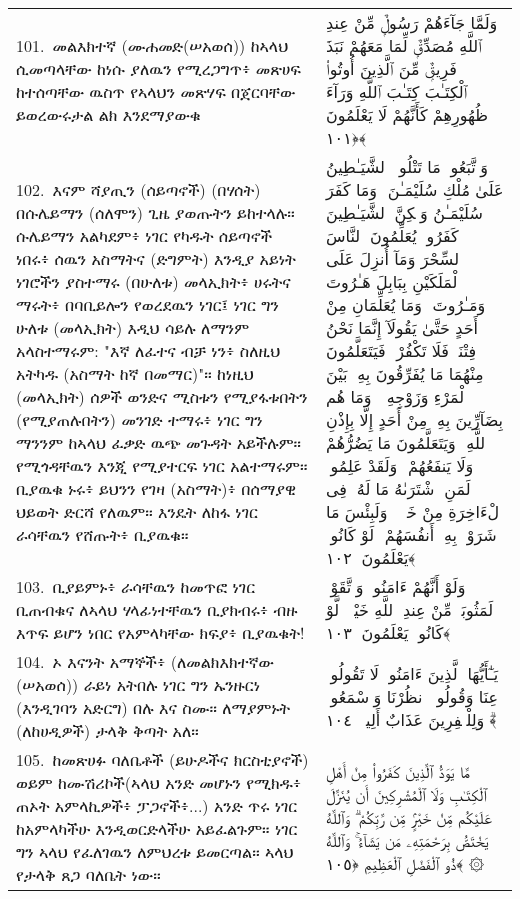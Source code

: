 \documentclass[11pt,a4paper,oneside]{article}%
\newcommand{\mytextarabic}[1]{\textarabic{ #1 \flushright}}
\begin{document}
\begin{longtable}{%
  @{}
    p{}
  @{~~~}
    p{}
    @{}
}
101.\ መልእክተኛ (ሙሐመድ(ሠአወሰ)) ከኣላህ ሲመጣላቸው ከነሱ ያለዉን የሚረጋግጥ፥ መጽሀፍ ከተሰጣቸው ዉስጥ የኣላህን መጽሃፍ በጀርባቸው ይወረውሩታል ልክ እንደማያውቁ  &  \mytextarabic{ وَلَمَّا جَآءَهُمْ رَسُولٌۭ مِّنْ عِندِ ٱللَّهِ مُصَدِّقٌۭ لِّمَا مَعَهُمْ نَبَذَ فَرِيقٌۭ مِّنَ ٱلَّذِينَ أُوتُوا۟ ٱلْكِتَـٰبَ كِتَـٰبَ ٱللَّهِ وَرَآءَ ظُهُورِهِمْ كَأَنَّهُمْ لَا يَعْلَمُونَ ﴿١٠١﴾}\\
102.\ እናም ሻያጢን (ሰይጣኖች) (በሃሰት) በሱሌይማን (ሰለሞን) ጊዜ ያወጡትን ይከተላሉ። ሱሌይማን አልካደም፥ ነገር የካዱት ሰይጣኖች ነበሩ፥ ሰዉን አስማትና (ድግምት) እንዲያ አይነት ነገሮችን ያስተማሩ (በሁለቱ) መላኢክት፥ ሀሩትና ማሩት፥ በባቢይሎን የወረደዉን ነገር፤ ነገር ግን ሁለቱ (መላኢክት) እዲህ ሳይሉ ለማንም አላስተማሩም: "እኛ ለፈተና ብቻ ነን፥ ስለዚህ አትካዱ (አስማት ከኛ በመማር)"። ከነዚህ (መላኢክት) ሰዎች ወንድና ሚስቱን የሚያፋቱበትን (የሚያጠሉበትን) መንገድ ተማሩ፥ ነገር ግን ማንንም ከኣላህ ፈቃድ ዉጭ መጉዳት አይችሉም። የሚጎዳቸዉን እንጂ የሚያተርፍ ነገር አልተማሩም። ቢያዉቁ ኑሩ፥ ይህንን የገዛ (አስማት)፥ በሰማያዊ ህይወት ድርሻ የለዉም። እንዴት ለከፋ ነገር ራሳቸዉን የሸጡት፥ ቢያዉቁ። &  \mytextarabic{ وَٱتَّبَعُوا۟ مَا تَتْلُوا۟ ٱلشَّيَـٰطِينُ عَلَىٰ مُلْكِ سُلَيْمَـٰنَ ۖ وَمَا كَفَرَ سُلَيْمَـٰنُ وَلَٟكِنَّ ٱلشَّيَـٰطِينَ كَفَرُوا۟ يُعَلِّمُونَ ٱلنَّاسَ ٱلسِّحْرَ وَمَآ أُنزِلَ عَلَى ٱلْمَلَكَيْنِ بِبَابِلَ هَـٰرُوتَ وَمَـٰرُوتَ ۚ وَمَا يُعَلِّمَانِ مِنْ أَحَدٍ حَتَّىٰ يَقُولَآ إِنَّمَا نَحْنُ فِتْنَةٌۭ فَلَا تَكْفُرْ ۖ فَيَتَعَلَّمُونَ مِنْهُمَا مَا يُفَرِّقُونَ بِهِۦ بَيْنَ ٱلْمَرْءِ وَزَوْجِهِۦ ۚ وَمَا هُم بِضَآرِّينَ بِهِۦ مِنْ أَحَدٍ إِلَّا بِإِذْنِ ٱللَّهِ ۚ وَيَتَعَلَّمُونَ مَا يَضُرُّهُمْ وَلَا يَنفَعُهُمْ ۚ وَلَقَدْ عَلِمُوا۟ لَمَنِ ٱشْتَرَىٰهُ مَا لَهُۥ فِى ٱلْءَاخِرَةِ مِنْ خَلَٟقٍۢ ۚ وَلَبِئْسَ مَا شَرَوْا۟ بِهِۦٓ أَنفُسَهُمْ ۚ لَوْ كَانُوا۟ يَعْلَمُونَ ﴿١٠٢﴾}\\
103.\ ቢያይምኑ፥ ራሳቸዉን ከመጥፎ ነገር ቢጠብቁና ለኣላህ ሃላፊነተቸዉን ቢያክብሩ፥ ብዙ እጥፍ ይሆን ነበር የአምላካቸው ክፍያ፥ ቢያዉቁት! &  \mytextarabic{وَلَوْ أَنَّهُمْ ءَامَنُوا۟ وَٱتَّقَوْا۟ لَمَثُوبَةٌۭ مِّنْ عِندِ ٱللَّهِ خَيْرٌۭ ۖ لَّوْ كَانُوا۟ يَعْلَمُونَ ﴿١٠٣﴾}\\
104.\ ኦ እናንት አማኞች፥ (ለመልክእክተኛው (ሠአወሰ)) ራይነ አትበሉ ነገር ግን ኡንዙርነ (እንዲገባን አድርግ) በሉ እና ስሙ። ለማያምኑት (ለከሀዲዎች) ታላቅ ቅጣት አለ። &  \mytextarabic{يَـٰٓأَيُّهَا ٱلَّذِينَ ءَامَنُوا۟ لَا تَقُولُوا۟ رَٟعِنَا وَقُولُوا۟ ٱنظُرْنَا وَٱسْمَعُوا۟ ۗ وَلِلْكَٟفِرِينَ عَذَابٌ أَلِيمٌۭ ﴿١٠٤﴾}\\
105.\ ከመጽሀፉ ባለቤቶች (ይሁዶችና ክርስቲያኖች) ወይም ከሙሽሪኮች(ኣላህ አንድ መሆኑን የሚክዱ፥ ጠኦት አምላኪዎች፥ ፓጋኖች፥...) አንድ ጥሩ ነገር ከአምላካችሁ እንዲወርድላችሁ አይፈልጉም። ነገር ግን ኣላህ የፈለገዉን ለምህረቱ ይመርጣል። ኣላህ የታላቅ ጸጋ ባለቤት ነው። &  \mytextarabic{ مَّا يَوَدُّ ٱلَّذِينَ كَفَرُوا۟ مِنْ أَهْلِ ٱلْكِتَـٰبِ وَلَا ٱلْمُشْرِكِينَ أَن يُنَزَّلَ عَلَيْكُم مِّنْ خَيْرٍۢ مِّن رَّبِّكُمْ ۗ وَٱللَّهُ يَخْتَصُّ بِرَحْمَتِهِۦ مَن يَشَآءُ ۚ وَٱللَّهُ ذُو ٱلْفَضْلِ ٱلْعَظِيمِ ﴿١٠٥﴾ ۞}\\

\end{longtable}
\end{document}

